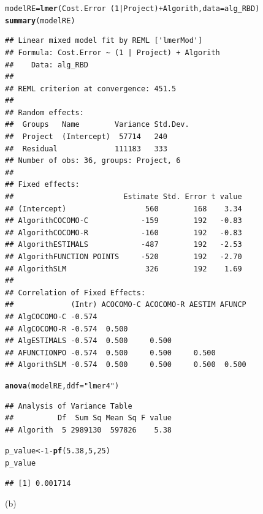 \documentclass[a4paper]{article}\usepackage{graphicx, color}
\makeatletter
\newcommand{\hlfunctioncall}[1]{\textcolor[rgb]{0.501960784313725,0,0.329411764705882}{\textbf{#1}}}%
\newcommand{\hlstring}[1]{\textcolor[rgb]{0.6,0.6,1}{#1}}%
\newenvironment{kframe}{%
 \def\at@end@of@kframe{}%
 \ifinner\ifhmode%
  \def\at@end@of@kframe{\end{minipage}}%
  \begin{minipage}{\columnwidth}%
 \fi\fi%
 \def\FrameCommand##1{\hskip\@totalleftmargin \hskip-\fboxsep
 \colorbox{shadecolor}{##1}\hskip-\fboxsep
     \hskip-\linewidth \hskip-\@totalleftmargin \hskip\columnwidth}%
 \MakeFramed {\advance\hsize-\width
   \@totalleftmargin\z@ \linewidth\hsize
   \@setminipage}}%
 {\par\unskip\endMakeFramed%
 \at@end@of@kframe}
\newenvironment{knitrout}{}{} %
\makeatother
\begin{document}
\begin{knitrout}
\begin{kframe}
\begin{alltt}
modelRE = \hlfunctioncall{lmer}(Cost.Error ~ (1 | Project) + Algorith, data = alg_RBD)
\hlfunctioncall{summary}(modelRE)
\end{alltt}
\begin{verbatim}
## Linear mixed model fit by REML ['lmerMod']
## Formula: Cost.Error ~ (1 | Project) + Algorith 
##    Data: alg_RBD 
## 
## REML criterion at convergence: 451.5 
## 
## Random effects:
##  Groups   Name        Variance Std.Dev.
##  Project  (Intercept)  57714   240     
##  Residual             111183   333     
## Number of obs: 36, groups: Project, 6
## 
## Fixed effects:
##                         Estimate Std. Error t value
## (Intercept)                  560        168    3.34
## AlgorithCOCOMO-C            -159        192   -0.83
## AlgorithCOCOMO-R            -160        192   -0.83
## AlgorithESTIMALS            -487        192   -2.53
## AlgorithFUNCTION POINTS     -520        192   -2.70
## AlgorithSLM                  326        192    1.69
## 
## Correlation of Fixed Effects:
##             (Intr) ACOCOMO-C ACOCOMO-R AESTIM AFUNCP
## AlgCOCOMO-C -0.574                                  
## AlgCOCOMO-R -0.574  0.500                           
## AlgESTIMALS -0.574  0.500     0.500                 
## AFUNCTIONPO -0.574  0.500     0.500     0.500       
## AlgorithSLM -0.574  0.500     0.500     0.500  0.500
\end{verbatim}
\begin{alltt}
\hlfunctioncall{anova}(modelRE, ddf = \hlstring{"lmer4"})
\end{alltt}
\begin{verbatim}
## Analysis of Variance Table
##          Df  Sum Sq Mean Sq F value
## Algorith  5 2989130  597826    5.38
\end{verbatim}
\begin{alltt}

p_value <- 1 - \hlfunctioncall{pf}(5.38, 5, 25)
p_value
\end{alltt}
\begin{verbatim}
## [1] 0.001714
\end{verbatim}
\end{kframe}
\end{knitrout}


(b)
\end{document}
